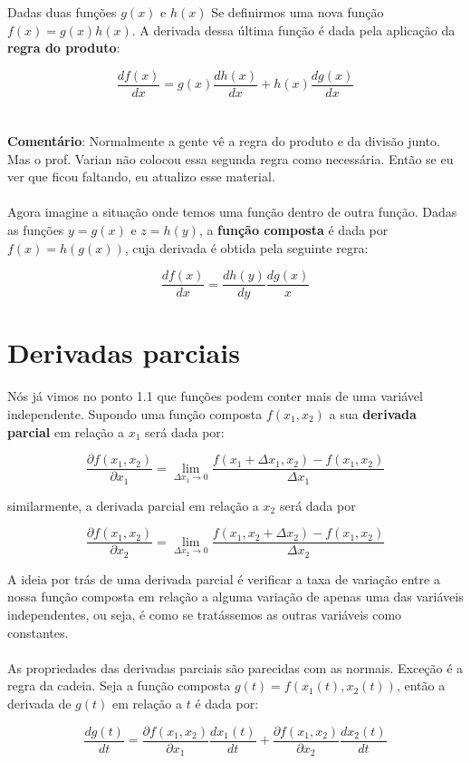\documentclass[a4paper,11pt,oneside]{book}
\theoremstyle{definition}
\theoremstyle{break}
\begin{document}
Dadas duas funções $g(x)$ e $h(x)$ Se definirmos uma nova função $f(x) = g(x) h(x)$. A derivada dessa última função é dada pela aplicação da \textbf{regra do produto}:

$$ \frac{df(x)}{dx} = g(x)\frac{dh(x)}{dx} + h(x)\frac{dg(x)}{dx}$$
\\~\\
\textbf{Comentário}: Normalmente a gente vê a regra do produto e da divisão junto. Mas o prof. Varian não colocou essa segunda regra como necessária. Então se eu ver que ficou faltando, eu atualizo esse material.
\\~\\
Agora imagine a situação onde temos uma função dentro de outra função. Dadas as funções $y = g(x)$ e $z = h(y)$, a \textbf{função composta} é dada por $f(x) = h(g(x))$, cuja derivada é obtida pela seguinte regra:

$$ \frac{df(x)}{dx} = \frac{dh(y)}{dy}\frac{dg(x)}{x}$$

\section*{Derivadas parciais}

Nós já vimos no ponto 1.1 que funções podem conter mais de uma variável independente. Supondo uma função composta $f(x_1,x_2)$ a sua \textbf{derivada parcial} em relação a $x_1$ será dada por:

$$ \frac{\partial f(x_1,x_2)}{\partial x_1} = 
\lim_{\Delta x_1 \to 0} \frac{f(x_1+\Delta x_1,x_2) - f(x_1,x_2)}{\Delta x_1} $$

similarmente, a derivada parcial em relação a $x_2$ será dada por

$$ \frac{\partial f(x_1,x_2)}{\partial x_2} = 
\lim_{\Delta x_2 \to 0} \frac{f(x_1,x_2+\Delta x_2) - f(x_1,x_2)}{\Delta x_2} $$

A ideia por trás de uma derivada parcial é verificar a taxa de variação entre a nossa função composta em relação a alguma variação de apenas uma das variáveis independentes, ou seja, é como se tratássemos as outras variáveis como constantes.
\\~\\
As propriedades das derivadas parciais são parecidas com as normais. Exceção é a regra da cadeia. Seja a função composta $g(t) = f(x_1(t),x_2(t))$, então a derivada de $g(t)$ em relação a $t$ é dada por:

$$ \frac{dg(t)}{dt} = 
\frac{\partial f(x_1,x_2)}{\partial x_1}\frac{dx_1(t)}{dt} + 
\frac{\partial f(x_1,x_2)}{\partial x_2}\frac{dx_2(t)}{dt} $$
\end{document}
